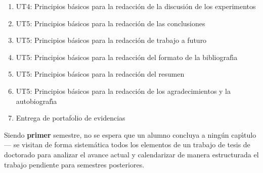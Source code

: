 \documentclass[10 pt]{article}
\begin{document}
\begin{enumerate}[itemsep=-2pt]
\item UT4: Principios b\'{a}sicos para la redacci\'{o}n de la discusi\'{o}n de los experimentos
\item UT5: Principios b\'{a}sicos para la redacci\'{o}n de las conclusiones
\item UT5: Principios b\'{a}sicos para la redacci\'{o}n de trabajo a futuro
\item UT5: Principios b\'{a}sicos para la redacci\'{o}n del formato de la bibliograf\'{\i}a
\item UT5: Principios b\'{a}sicos para la redacci\'{o}n del resumen
\item UT5: Principios b\'{a}sicos para la redacci\'{o}n de los agradecimientos y la autobiograf\'{\i}a
\item Entrega de portafolio de evidencias
\end{enumerate}



Siendo {\bf primer} semestre, no se espera que un alumno concluya a
ning\'{u}n cap\'{\i}tulo --- se visitan de forma sistem\'{a}tica todos
los elementos de un trabajo de tesis de doctorado para analizar el
avance actual y calendarizar de manera estructurada el trabajo
pendiente para semestres posteriores.


\end{document}

